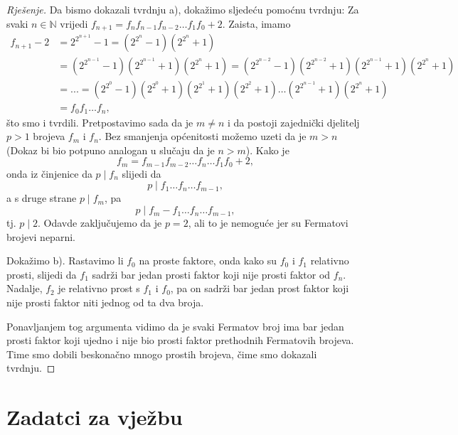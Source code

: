 \begin{proof}[Rješenje]
Da bismo dokazali tvrdnju a), dokažimo sljedeću pomoćnu tvrdnju: Za svaki $n\in \mathbb{N}$ vrijedi $f_{n+1}=f_nf_{n-1}f_{n-2}\dots f_1f_0+2$. Zaista, imamo
\begin{align*}
f_{n+1}-2&=2^{2^{n+1}}-1=(2^{2^n}-1)(2^{2^n}+1)\\
&=(2^{2^{n-1}}-1)(2^{2^{n-1}}+1)(2^{2^n}+1)=(2^{2^{n-2}}-1)(2^{2^{n-2}}+1)(2^{2^{n-1}}+1)(2^{2^n}+1)\\
&=...=(2^{2^0}-1)(2^{2^0}+1)(2^{2^1}+1)(2^{2^2}+1)\dots(2^{2^{n-1}}+1)(2^{2^n}+1)\\
&=f_0f_1\dots f_n,
\end{align*}
što smo i tvrdili. Pretpostavimo sada da je $m\neq n$ i da postoji zajednički djelitelj $p>1$ brojeva $f_m$ i $f_n$. Bez smanjenja općenitosti možemo uzeti da je $m>n$ (Dokaz bi bio potpuno analogan u slučaju da je $n>m$). Kako je $$f_m=f_{m-1}f_{m-2}\dots f_{n}\dots f_1f_0+2,$$ onda iz činjenice da $p\; |\; f_n$ slijedi da $$p\; |\; f_1\dots f_n\dots f_{m-1},$$ a s druge strane $p\; |\; f_m$, pa $$p \; |\; f_m-f_1\dots f_n\dots f_{m-1},$$ tj. $p\; |\; 2$. Odavde zaključujemo da je $p=2$, ali to je nemoguće jer su Fermatovi brojevi neparni.

Dokažimo b). Rastavimo li $f_0$ na proste faktore, onda kako su $f_{0}$ i $f_{1}$ relativno prosti, slijedi da $f_{1}$ sadrži bar jedan prosti faktor koji nije prosti faktor od $f_{n}$. Nadalje, $f_{2}$ je relativno prost s $f_{1}$ i $f_{0}$, pa on sadrži bar jedan prost faktor koji nije prosti faktor niti jednog od ta dva broja. 

Ponavljanjem tog argumenta vidimo da je svaki Fermatov broj ima bar jedan prosti faktor koji ujedno i nije bio prosti faktor prethodnih Fermatovih brojeva. Time smo dobili beskonačno mnogo prostih brojeva, čime smo dokazali tvrdnju.
\end{proof}
\newpage
\section*{Zadatci za vježbu}
